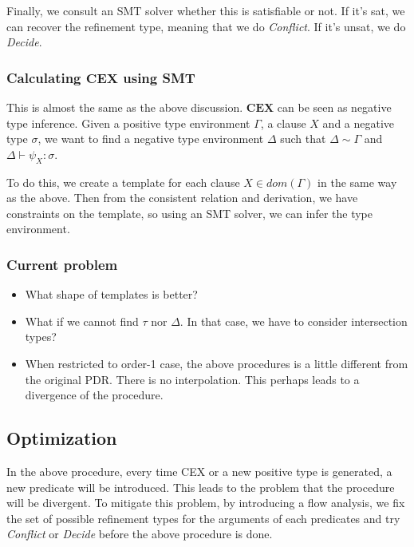 \documentclass[runningheads]{llncs}
\newcommand\COL{\mathbin{:}}
\newcommand {\rdecide} {\emph{Decide}}
\newcommand {\rconflict} {\emph{Conflict}}
\newcommand {\consistent}{\sim}
\begin{document}
Finally, we consult an SMT solver whether this is satisfiable or not.
If it's sat, we can recover the refinement type, meaning that
we do \rconflict{}.
If it's unsat, we do \rdecide{}.

\subsubsection{Calculating \( \textbf{CEX} \) using SMT}

This is almost the same as the above discussion.
\( \textbf{CEX} \) can be seen as negative type inference. Given a positive type environment \( \Gamma \), a clause \( X \) and a negative type \( \sigma \), we want to find a negative type environment \( \Delta \) such that \( \Delta \consistent \Gamma \) and \( \Delta \vdash \psi_X \COL \sigma \).

To do this, we create a template for each clause \( X \in dom(\Gamma) \) in the same way as the above. Then from the consistent relation and derivation, we have constraints on the template, so using an SMT solver, we can infer the type environment.

\subsubsection{Current problem}

\begin{itemize}
    \item What shape of templates is better?
    \item What if we cannot find \( \tau \) nor \( \Delta \).
    In that case, we have to consider intersection types?
    \item When restricted to order-1 case, the above procedures is
    a little different from the original PDR. There is no interpolation.
    This perhaps leads to a divergence of the procedure.
\end{itemize}

\subsection{Optimization}

In the above procedure, every time CEX or a new positive type is generated, a new predicate will be introduced. This leads to the problem that the procedure will be divergent. To mitigate this problem, by introducing a flow analysis, we fix the set of possible refinement types for the arguments of each predicates and try \rconflict{} or \rdecide{} before the above procedure is done.
\end{document}
